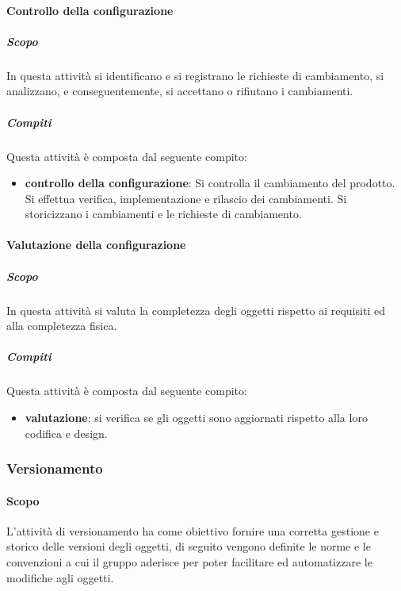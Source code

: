 \paragraph{Controllo della configurazione}
\label{par:controllo_della_configurazione}
\subparagraph{Scopo}
\label{par:controllo_della_configurazione:scopo}
In questa attività si identificano e si registrano le richieste di cambiamento, si analizzano, e conseguentemente, si accettano o rifiutano i cambiamenti.
\subparagraph{Compiti}
\label{par:controllo_della_configurazione:compiti}
Questa attività è composta dal seguente compito:
\begin{itemize}
    \item \textbf{controllo della configurazione}: Si controlla il cambiamento del prodotto. Si effettua verifica, implementazione e rilascio dei cambiamenti. Si storicizzano i cambiamenti e le richieste di cambiamento.
\end{itemize}

\paragraph{Valutazione della configurazione}
\label{par:valutazione_della_configurazione}
\subparagraph{Scopo}
\label{par:valutazione_della_configurazione:scopo}
In questa attività si valuta la completezza degli oggetti rispetto ai requisiti ed alla completezza fisica.
\subparagraph{Compiti}
\label{par:valutazione_della_configurazione:compiti}
Questa attività è composta dal seguente compito:
\begin{itemize}
    \item \textbf{valutazione}: si verifica se gli oggetti sono aggiornati rispetto alla loro codifica e design.
\end{itemize}


\subsubsection{Versionamento}
\label{ssub:gestione_configurazione:versionamento}

\paragraph{Scopo}

L'attività di versionamento ha come obiettivo fornire una corretta gestione e storico delle versioni degli oggetti, di seguito vengono
definite le norme e le convenzioni a cui il gruppo aderisce per poter facilitare ed automatizzare le modifiche agli oggetti.

